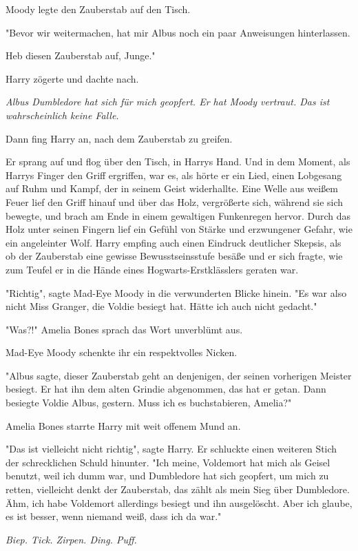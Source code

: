 {Moody legte den Zauberstab auf den Tisch.

"Bevor wir weitermachen, hat mir Albus noch ein paar Anweisungen hinterlassen.

Heb diesen Zauberstab auf, Junge."

Harry zögerte und dachte nach.

\emph{Albus Dumbledore hat sich für mich geopfert. Er hat Moody vertraut. Das ist wahrscheinlich keine Falle.}

Dann fing Harry an, nach dem Zauberstab zu greifen.

Er sprang auf und flog über den Tisch, in Harrys Hand. Und in dem Moment, als Harrys Finger den Griff ergriffen, war es, als hörte er ein Lied, einen Lobgesang auf Ruhm und Kampf, der in seinem Geist widerhallte. Eine Welle aus weißem Feuer lief den Griff hinauf und über das Holz, vergrößerte sich, während sie sich bewegte, und brach am Ende in einem gewaltigen Funkenregen hervor. Durch das Holz unter seinen Fingern lief ein Gefühl von Stärke und erzwungener Gefahr, wie ein angeleinter Wolf. Harry empfing auch einen Eindruck deutlicher Skepsis, als ob der Zauberstab eine gewisse Bewusstseinsstufe besäße und er sich fragte, wie zum Teufel er in die Hände eines Hogwarts-Erstklässlers geraten war.

"Richtig", sagte Mad-Eye Moody in die verwunderten Blicke hinein. "Es war also nicht Miss Granger, die Voldie besiegt hat. Hätte ich auch nicht gedacht."

"Was?!" Amelia Bones sprach das Wort unverblümt aus.

Mad-Eye Moody schenkte ihr ein respektvolles Nicken.

"Albus sagte, dieser Zauberstab geht an denjenigen, der seinen vorherigen Meister besiegt. Er hat ihn dem alten Grindie abgenommen, das hat er getan. Dann besiegte Voldie Albus, gestern. Muss ich es buchstabieren, Amelia?"

Amelia Bones starrte Harry mit weit offenem Mund an.

"Das ist vielleicht nicht richtig", sagte Harry. Er schluckte einen weiteren Stich der schrecklichen Schuld hinunter. "Ich meine, Voldemort hat mich als Geisel benutzt, weil ich dumm war, und Dumbledore hat sich geopfert, um mich zu retten, vielleicht denkt der Zauberstab, das zählt als mein Sieg über Dumbledore. Ähm, ich habe Voldemort allerdings besiegt und ihn ausgelöscht. Aber ich glaube, es ist besser, wenn niemand weiß, dass ich da war."

\emph{Biep. Tick. Zirpen. Ding. Puff.}

}
